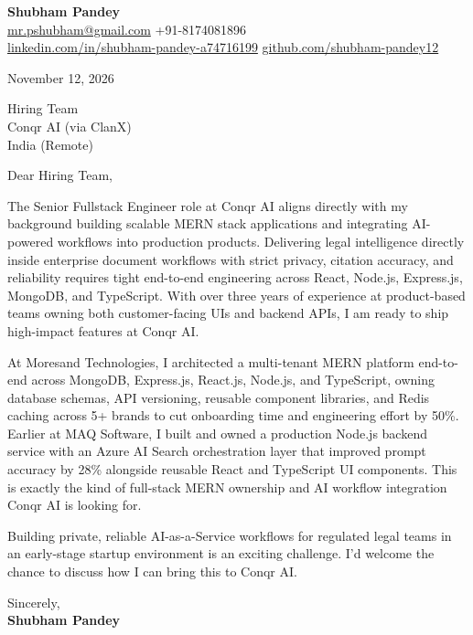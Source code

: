 \documentclass[a4paper,11pt]{article}
\begin{document}
\textbf{\Large Shubham Pandey}\\
\href{mailto:mr.pshubham@gmail.com}{mr.pshubham@gmail.com} \quad +91-8174081896\\
\href{https://www.linkedin.com/in/shubham-pandey-a74716199/}{linkedin.com/in/shubham-pandey-a74716199} \quad
\href{https://github.com/shubham-pandey12}{github.com/shubham-pandey12}

\vspace{1em}
November 12, 2026

\vspace{1em}
Hiring Team\\
Conqr AI (via ClanX)\\
India (Remote)

\vspace{1em}
Dear Hiring Team,

The Senior Fullstack Engineer role at Conqr AI aligns directly with my background building scalable MERN stack applications and integrating AI-powered workflows into production products. Delivering legal intelligence directly inside enterprise document workflows with strict privacy, citation accuracy, and reliability requires tight end-to-end engineering across React, Node.js, Express.js, MongoDB, and TypeScript. With over three years of experience at product-based teams owning both customer-facing UIs and backend APIs, I am ready to ship high-impact features at Conqr AI.

At Moresand Technologies, I architected a multi-tenant MERN platform end-to-end across MongoDB, Express.js, React.js, Node.js, and TypeScript, owning database schemas, API versioning, reusable component libraries, and Redis caching across 5+ brands to cut onboarding time and engineering effort by 50\%. Earlier at MAQ Software, I built and owned a production Node.js backend service with an Azure AI Search orchestration layer that improved prompt accuracy by 28\% alongside reusable React and TypeScript UI components. This is exactly the kind of full-stack MERN ownership and AI workflow integration Conqr AI is looking for.

Building private, reliable AI-as-a-Service workflows for regulated legal teams in an early-stage startup environment is an exciting challenge. I'd welcome the chance to discuss how I can bring this to Conqr AI.

\vspace{1em}
Sincerely,\\[0.5em]
\textbf{Shubham Pandey}
\end{document}
